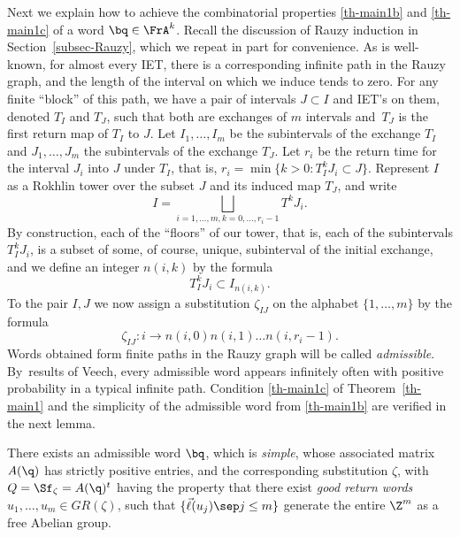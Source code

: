 Next we explain how to achieve the combinatorial properties \eqref{th-main1b} and \eqref{th-main1c} of a word $\bq\in \FrA^k$. Recall the discussion of Rauzy induction in Section~\ref{subsec-Rauzy}, which we repeat in part for convenience.
As is well-known, for almost every IET, there is a corresponding infinite path in the Rauzy graph, and the length of the interval on which we induce tends to zero. For any finite ``block'' of this path, we
have a pair of intervals $J\subset I$ and IET's on them, denoted $T_I$ and $T_J$, such that both are
exchanges of $m$ intervals and~$T_J$ is the first return map of $T_I$ to $J$. Let $I_1, \dots, I_m$ be the subintervals of the exchange $T_I$ and $J_1, \dots, J_m$ the subintervals of the exchange $T_J$.
Let $r_i$ be the return time for the interval $J_i$ into $J$ under $T_I$, that is,
$
r_i=\min\{ k>0: T_I^kJ_i\subset J\}.
$
Represent $I$ as a Rokhlin tower over the subset $J$ and its induced map $T_J$, and write
\[
I=\bigsqcup\limits_{i=1,\dots, m, k=0, \dots, r_i-1} T^{k}J_i.
\]
By construction, each of the ``floors'' of our tower, that is, each of the subintervals $T_I^{k}J_i$, is a subset of some, of course, unique, subinterval of the initial exchange, and we define an integer $n(i,k)$ by the formula
\[
T_I^{k}J_i\subset I_{n(i,k)}.
\]
To the pair $I,J$ we now assign a substitution $\zeta_{IJ}$ on the alphabet
$\{1, \dots, m\}$ by the formula
\begin{equation} \label{zeta-def}
\zeta_{IJ}: i\to n(i,0)n(i,1)\dots n(i, r_i-1).
\end{equation}
Words obtained form finite paths in the Rauzy graph will be called \emph{admissible}. By~\hbox{results} of Veech, every admissible word appears infinitely often with positive probability in a typical infinite path. Condition \eqref{th-main1c} of Theorem~\ref{th-main1} and the simplicity of the admissible word from \eqref{th-main1b} are verified in the next lemma.
\begin{lemma} \label{lem-combi1}
There exists an admissible word $\bq$, which is \emph{simple}, whose associated matrix $A(\q)$ has strictly positive entries, and the corresponding substitution $\zeta$, with $Q = \Sf_\zeta=A(\q)^t$ having the property that there exist \emph{good return words}
$u_1,\ldots,u_m\in GR(\zeta)$, such that $\{\vec{\ell}(u_j)\sep j\le m\}$ generate the entire
$\Z^m$ as a free Abelian group.
\end{lemma}

